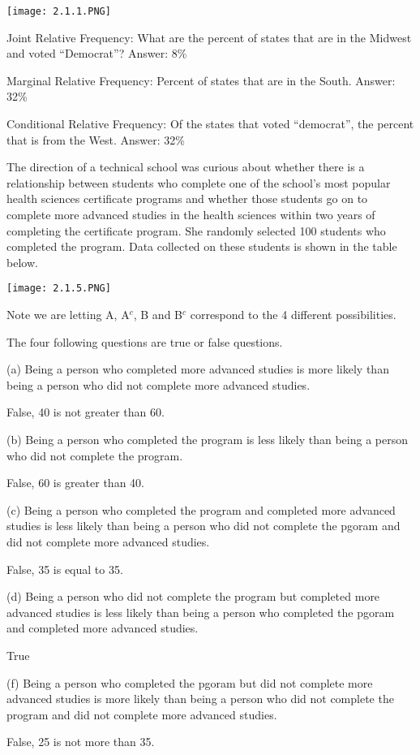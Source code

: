 \documentclass[../stats.tex]{subfiles}
\begin{document}
\begin{example}
    \begin{center}
        \texttt{[image: 2.1.1.PNG]}
    \end{center}

    Joint Relative Frequency: What are the percent of states that are in the Midwest and voted ``Democrat''? Answer: 8\%

    Marginal Relative Frequency: Percent of states that are in the South. Answer: 32\%

    Conditional Relative Frequency: Of the states that voted ``democrat'', the percent that is from the West. Answer: 32\%
\end{example}

\begin{example}
    The direction of a technical school was curious about whether there is a relationship between students who complete one of the school's 
    most popular health sciences certificate programs and whether those students go on to complete more advanced studies in the health sciences within 
    two years of completing the certificate program. She randomly selected 100 students who completed the program. Data collected on these students is shown in the table below.
    \begin{center}
        \texttt{[image: 2.1.5.PNG]}
    \end{center}

    Note we are letting A, A$^c$, B and B$^c$ correspond to the 4 different possibilities.

    The four following questions are true or false questions.

    (a) Being a person who completed more advanced studies is more likely than being a person who did not complete more advanced studies.

    False, 40 is not greater than 60.

    (b) Being a person who completed the program is less likely than being a person who did not complete the program.

    False, 60 is greater than 40.

    (c) Being a person who completed the program and completed more advanced studies is less likely than being a person who did not complete the pgoram and did not complete more advanced studies.

    False, 35 is equal to 35.

    (d) Being a person who did not complete the program but completed more advanced studies is less likely than being a person who completed the pgoram and completed more advanced studies.

    True

    (f) Being a person who completed the pgoram but did not complete more advanced studies is more likely than being a person who did not complete the program and did not complete more advanced studies.

    False, 25 is not more than 35.
\end{example}
\end{document}
